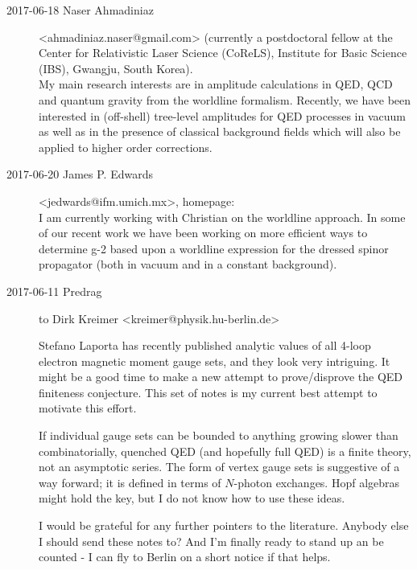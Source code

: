 \begin{description}
\item[2017-06-18 Naser Ahmadiniaz] <ahmadiniaz.naser@gmail.com>
(currently a postdoctoral fellow at the Center for Relativistic Laser
Science (CoReLS), Institute for Basic Science (IBS), Gwangju, South
Korea).
\\
My main research
interests are in amplitude calculations in QED, QCD and quantum gravity
from the worldline formalism. Recently, we have been interested in
(off-shell) tree-level amplitudes for QED processes in vacuum as well as
in the presence of classical background fields which will also be applied
to higher order corrections.

\item[2017-06-20 James P. Edwards] <jedwards@ifm.umich.mx>,
{homepage}:
\\
I am currently working with Christian on the worldline approach. In some
of our recent work we have been working on more efficient ways to
determine g-2 based upon a worldline expression for the dressed spinor
propagator (both in vacuum and in a constant background).

\item[2017-06-11 Predrag] to
Dirk Kreimer <kreimer@physik.hu-berlin.de>
%
%

Stefano Laporta  has recently published analytic values of all 4-loop
electron magnetic moment gauge sets, and they look very intriguing.
It might be a good time to make a new attempt to prove/disprove
the QED finiteness conjecture. This set of notes is my current best attempt
to motivate this effort.

If individual gauge sets can be bounded to anything growing slower than
combinatorially, quenched QED (and hopefully full QED) is a finite
theory, not an asymptotic series. The form of vertex gauge sets is
suggestive of a way forward; it is defined in terms of $N$-photon
exchanges. Hopf algebras might hold the key, but I do not know how to use
these ideas.

I would be grateful for any further pointers to the literature.
Anybody else I should send these notes to? And I'm
finally ready to stand up an be counted - I can fly to Berlin on a short
notice if that helps.


\end{description}

